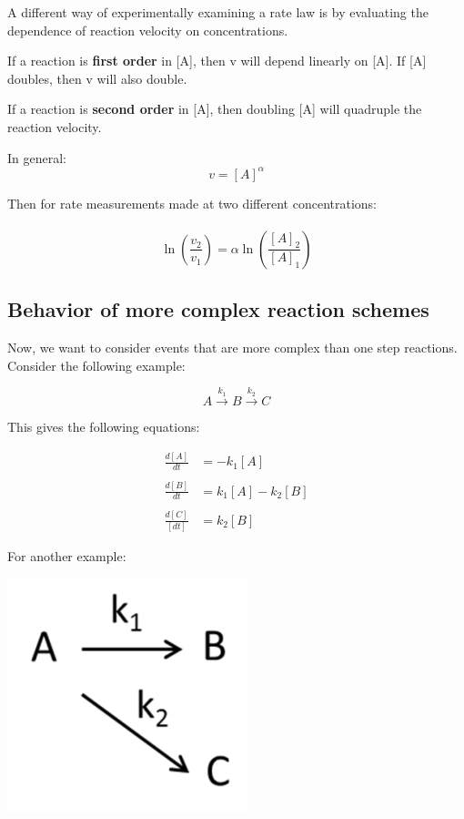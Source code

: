\documentclass[12pt, letterpaper]{article}
\begin{document}
    A different way of experimentally examining a rate law is by evaluating the 
    dependence of reaction velocity on concentrations. 

    If a reaction is \textbf{first order} in [A], then v will depend linearly on [A]. 
    If [A] doubles, then v will also double. 

    If a reaction is \textbf{second order} in [A], then doubling [A] will quadruple the 
    reaction velocity. 

    In general: 
    \begin{equation}
        v = [A]^{\alpha}
    \end{equation}

    Then for rate measurements made at two different concentrations: \\ \\
    \begin{equation}
        \ln(\frac{v_2}{v_1}) = \alpha \ln(\frac{[A]_2}{[A]_1})
    \end{equation}

    \subsection*{Behavior of more complex reaction schemes}

    Now, we want to consider events that are more complex than one step reactions. Consider 
    the following example: 

    \begin{equation*}
        A \stackrel{k_1} \longrightarrow B \stackrel {k_2} \longrightarrow  C
    \end{equation*}
   
    This gives the following equations:

    \begin{align*}
        \frac{d[A]}{dt} &= -k_1[A] \\ \\
        \frac{d[B]}{dt} &= k_1[A] - k_2[B] \\ \\
        \frac{d[C]}{[dt]} &= k_2[B]  
    \end{align*}
    
    \newpage
    For another example: 

    \begin{center}
        \includegraphics[scale = 0.5]{Complex Reaction.png}
    \end{center}
\end{document}
